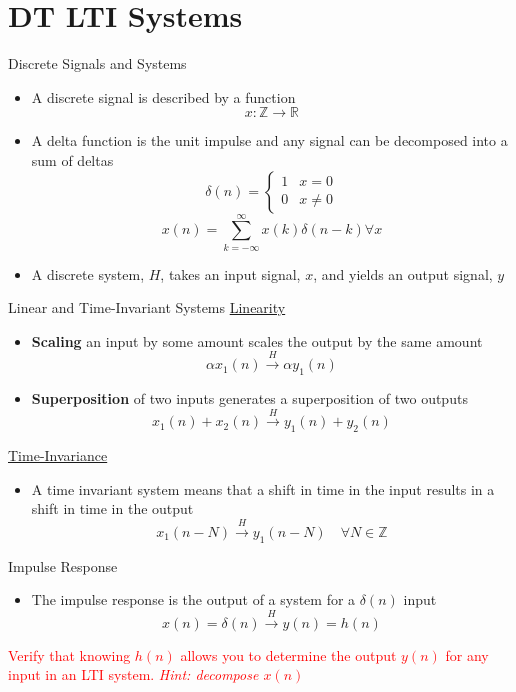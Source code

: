 \section{DT LTI Systems}

\begin{frame}{Discrete Signals and Systems}

    \begin{itemize}
        \item A discrete signal is described by a function
            \[
                x: \mathbb{Z} \rightarrow \mathbb{R}
            \]
        \item A delta function is the unit impulse and any signal can be decomposed into a sum of deltas
            \[
                \delta(n) = 
                \begin{cases}
                    1 & x= 0 \\
                    0 & x\ne 0
                \end{cases}
            \]
            \[
                x(n) = \sum_{k=-\infty}^{\infty} x(k)\delta(n-k) \forall x
            \]
        \item A discrete system, $H$, takes an input signal, $x$, and yields an output signal, $y$
    \end{itemize}
\end{frame}

\begin{frame}{Linear and Time-Invariant Systems}
    \underline{Linearity}
    \begin{itemize}
        \item \textbf{Scaling} an input by some amount scales the output by the same amount
        \[\alpha x_1(n) \overset{H}{\longrightarrow} \alpha y_1(n)\]
        \item \textbf{Superposition} of two inputs generates a superposition of two outputs
        \[x_1(n) + x_2(n) \overset{H}{\longrightarrow} y_1(n) + y_2(n)\]
    \end{itemize}
    \underline{Time-Invariance}
    \begin{itemize}
        \item A time invariant system means that a shift in time in the input results in a shift in time in the output
        \[
        x_1(n-N) \overset{H}{\longrightarrow} y_1(n-N)\quad \forall N \in \mathbb{Z}
        \]
    \end{itemize}
\end{frame}

\begin{frame}{Impulse Response}
\begin{itemize}
    \item The impulse response is the output of a system for a $\delta(n)$ input
    \[
        x(n) = \delta(n) \overset{H}{\longrightarrow} y(n) = h(n)
    \]
\end{itemize}

\vspace{30px}

\textcolor{red}{Verify that knowing $h(n)$ allows you to determine the output $y(n)$ for any input in an LTI system. \textit{Hint: decompose $x(n)$}}
    
\end{frame}

